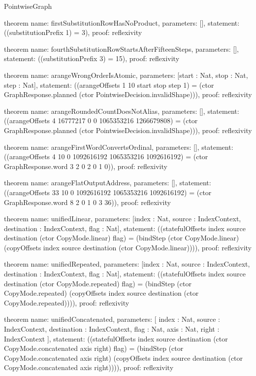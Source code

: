 \begin{lexlean}{PointwiseGraph}
\begin{semanticmodule}
theorem{
  name: firstSubstitutionRowHasNoProduct,
  parameters: [],
  statement: ((substitutionPrefix 1) = 3),
  proof: reflexivity{}
}

theorem{
  name: fourthSubstitutionRowStartsAfterFifteenSteps,
  parameters: [],
  statement: ((substitutionPrefix 3) = 15),
  proof: reflexivity{}
}

theorem{
  name: arangeWrongOrderIsAtomic,
  parameters: [start : Nat, stop : Nat, step : Nat],
  statement: ((arangeOffsets 1 10 start stop step 1) = (ctor GraphResponse.planned (ctor PointwiseDecision.invalidShape))),
  proof: reflexivity{}
}

theorem{
  name: arangeRoundedCountDoesNotAlias,
  parameters: [],
  statement: ((arangeOffsets 4 16777217 0 0 1065353216 1266679808) = (ctor GraphResponse.planned (ctor PointwiseDecision.invalidShape))),
  proof: reflexivity{}
}

theorem{
  name: arangeFirstWordConvertsOrdinal,
  parameters: [],
  statement: ((arangeOffsets 4 10 0 1092616192 1065353216 1092616192) = (ctor GraphResponse.word 3 2 0 2 0 1 0)),
  proof: reflexivity{}
}

theorem{
  name: arangeFlatOutputAddress,
  parameters: [],
  statement: ((arangeOffsets 33 10 0 1092616192 1065353216 1092616192) = (ctor GraphResponse.word 8 2 0 1 0 3 36)),
  proof: reflexivity{}
}

theorem{
  name: unifiedLinear,
  parameters: [index : Nat, source : IndexContext, destination : IndexContext, flag : Nat],
  statement: ((statefulOffsets index source destination (ctor CopyMode.linear) flag) = (bindStep (ctor CopyMode.linear) (copyOffsets index source destination (ctor CopyMode.linear)))),
  proof: reflexivity{}
}

theorem{
  name: unifiedRepeated,
  parameters: [index : Nat, source : IndexContext, destination : IndexContext, flag : Nat],
  statement: ((statefulOffsets index source destination (ctor CopyMode.repeated) flag) = (bindStep (ctor CopyMode.repeated) (copyOffsets index source destination (ctor CopyMode.repeated)))),
  proof: reflexivity{}
}

theorem{
  name: unifiedConcatenated,
  parameters: [
    index : Nat,
    source : IndexContext,
    destination : IndexContext,
    flag : Nat,
    axis : Nat,
    right : IndexContext
  ],
  statement: ((statefulOffsets index source destination (ctor CopyMode.concatenated axis right) flag) = (bindStep (ctor CopyMode.concatenated axis right) (copyOffsets index source destination (ctor CopyMode.concatenated axis right)))),
  proof: reflexivity{}
}


\end{semanticmodule}
\end{lexlean}
